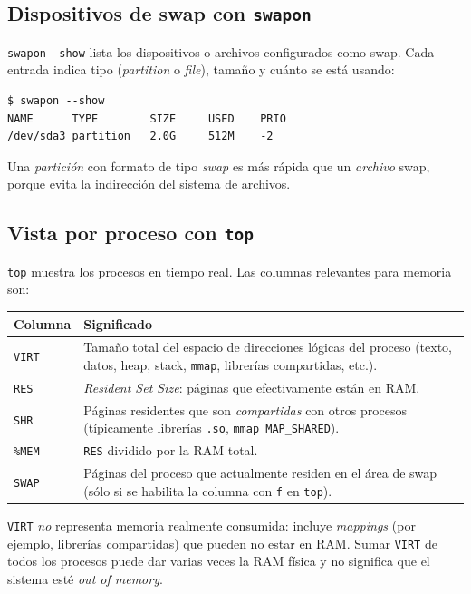 \documentclass[11pt,a4paper]{article}
\begin{document}
\subsection{Dispositivos de swap con \texttt{swapon}}

\texttt{swapon --show} lista los dispositivos o archivos configurados
como swap. Cada entrada indica tipo (\emph{partition} o \emph{file}),
tamaño y cuánto se está usando:

\begin{lstlisting}[style=shellstyle]
$ swapon --show
NAME      TYPE        SIZE     USED    PRIO
/dev/sda3 partition   2.0G     512M    -2
\end{lstlisting}

Una \emph{partición} con formato de tipo \emph{swap} es más rápida que
un \emph{archivo} swap, porque evita la indirección del sistema de
archivos.

\subsection{Vista por proceso con \texttt{top}}

\texttt{top} muestra los procesos en tiempo real. Las columnas
relevantes para memoria son:

\begin{center}
\small
\begin{tabular}{@{}lp{11cm}@{}}
\toprule
Columna & Significado \\
\midrule
\texttt{VIRT} & Tamaño total del espacio de direcciones lógicas del proceso (texto, datos, heap, stack, \texttt{mmap}, librerías compartidas, etc.). \\
\texttt{RES}  & \emph{Resident Set Size}: páginas que efectivamente están en RAM. \\
\texttt{SHR}  & Páginas residentes que son \emph{compartidas} con otros procesos (típicamente librerías \texttt{.so}, \texttt{mmap MAP\_SHARED}). \\
\texttt{\%MEM} & \texttt{RES} dividido por la RAM total. \\
\texttt{SWAP} & Páginas del proceso que actualmente residen en el área de swap (sólo si se habilita la columna con \texttt{f} en \texttt{top}). \\
\bottomrule
\end{tabular}
\end{center}

\begin{importante}
\texttt{VIRT} \emph{no} representa memoria realmente consumida: incluye
\emph{mappings} (por ejemplo, librerías compartidas) que pueden no
estar en RAM. Sumar \texttt{VIRT} de todos los procesos puede dar
varias veces la RAM física y no significa que el sistema esté
\emph{out of memory}.
\end{importante}
\end{document}
